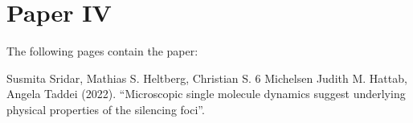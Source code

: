 
\chapter{Paper IV}
\label{chapter:diffusion}

The following pages contain the paper:
\vspace*{1cm}


Susmita Sridar, Mathias S. Heltberg, Christian S. 6 Michelsen Judith M. Hattab, Angela Taddei (2022). ``Microscopic single molecule dynamics suggest underlying physical properties of the silencing foci''.

% 